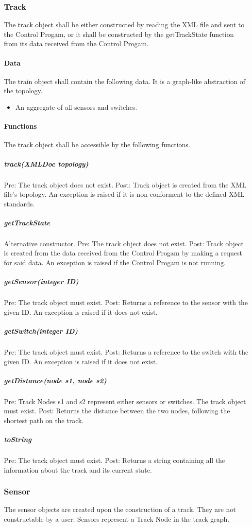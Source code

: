 \documentclass[a4paper,11pt,notitlepage]{article}
\def\CS{Control Progam\xspace} \def\LC{Local Copy of Train State\xspace} \def\TN{Track Node\xspace}
\begin{document}
\subsubsection{Track}
The track object shall be either constructed by reading the XML file and sent to the \CS, or it shall be constructed by the getTrackState function from its data received from the \CS.
\paragraph{Data}
The train object shall contain the following data. It is a graph-like abstraction of the topology.
\begin{itemize}
\item An aggregate of all sensors and switches.
\end{itemize}
\paragraph{Functions}
The track object shall be accessible by the following functions.
\subparagraph{track(XMLDoc topology)} Pre: The track object does not exist. Post: Track object is created from the XML file's topology. An exception is raised if it is non-conforment to the defined XML standards.
\subparagraph{getTrackState} Alternative constructor. Pre: The track object does not exist. Post: Track object is created from the data received from the \CS by making a request for said data. An exception is raised if the \CS is not running.
\subparagraph{getSensor(integer ID)} Pre: The track object must exist. Post: Returns a reference to the sensor with the given ID. An exception is raised if it does not exist.
\subparagraph{getSwitch(integer ID)} Pre: The track object must exist. Post: Returns a reference to the switch with the given ID. An exception is raised if it does not exist.
\subparagraph{getDistance(node s1, node s2)} Pre: \TN{}s s1 and s2 represent either sensors or switches. The track object must exist. Post: Returns the distance between the two nodes, following the shortest path on the track.
\subparagraph{toString} Pre: The track object must exist. Post: Returns a string containing all the information about the track and its current state.

\subsubsection{Sensor}
The sensor objects are created upon the construction of a track. They are not constructable by a user. Sensors represent a \TN in the track graph.
\end{document}

